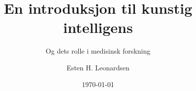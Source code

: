 \documentclass[aspectratio=169]{beamer}
\title{En introduksjon til kunstig intelligens}
\subtitle{Og dets rolle i medisinsk forskning}
\author{Esten H. Leonardsen}
\date{\today}
\begin{document}
	\begin{frame}
	 	\titlepage
	\end{frame}

    
    
\end{document}
